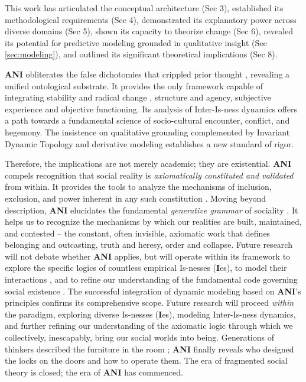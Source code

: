 \documentclass{article}
\newcommand{\ANI}{\textbf{ANI}}             %
\newcommand{\Isness}{\mathbf{I}}            %
\begin{document}
This work has articulated the conceptual architecture (Sec 3), established its methodological requirements (Sec 4), demonstrated its explanatory power across diverse domains (Sec 5), shown its capacity to theorize change (Sec 6), revealed its potential for predictive modeling grounded in qualitative insight (Sec \ref{sec:modeling}), and outlined its significant theoretical implications (Sec 8).

\ANI{} obliterates the false dichotomies that crippled prior thought \citep{Giddens1984}, revealing a unified ontological substrate. It provides the only framework capable of integrating stability and radical change \citep{Prigogine1984}, structure and agency, subjective experience and objective functioning. Its analysis of Inter-Is-ness dynamics offers a path towards a fundamental science of socio-cultural encounter, conflict, and hegemony. The insistence on qualitative grounding \citep{DenzinLincoln2011} complemented by Invariant Dynamic Topology and derivative modeling establishes a new standard of rigor.

Therefore, the implications are not merely academic; they are existential. \ANI{} compels recognition that social reality is \textit{axiomatically constituted and validated} from within. It provides the tools to analyze the mechanisms of inclusion, exclusion, and power inherent in any such constitution \citep{Foucault1972}. Moving beyond description, \ANI{} elucidates the fundamental \textit{generative grammar} of sociality \citep{Bourdieu1990}. It helps us to recognize the mechanisms by which our realities are built, maintained, and contested – the constant, often invisible, axiomatic work that defines belonging and outcasting, truth and heresy, order and collapse. Future research will not debate whether \ANI{} applies, but will operate within its framework to explore the specific logics of countless empirical Is-nesses ($\Isness$es), to model their interactions \citep{Luhmann1995}, and to refine our understanding of the fundamental code governing social existence \citep{Hofstadter1979}. The successful integration of dynamic modeling based on \ANI{}'s principles confirms its comprehensive scope. Future research will proceed \textit{within} the paradigm, exploring diverse Is-nesses ($\Isness$es), modeling Inter-Is-ness dynamics, and further refining our understanding of the axiomatic logic through which we collectively, inescapably, bring our social worlds into being. Generations of thinkers described the furniture in the room \citep{Geertz1973}; \ANI{} finally reveals who designed the locks on the doors and how to operate them. The era of fragmented social theory is closed; the era of \ANI{} has commenced.
\end{document}
